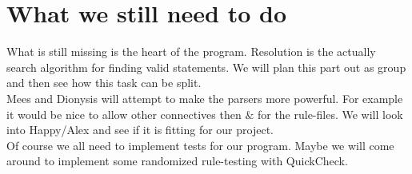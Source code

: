 \section{What we still need to do}
What is still missing is the heart of the program. Resolution is the actually search algorithm for finding valid statements. We will plan this part out as group and then see how this task can be split. \\
Mees and Dionysis will attempt to make the parsers more powerful. For example it would be nice to allow other connectives then $\&$ for the rule-files. We will look into Happy/Alex and see if it is fitting for our project.\\
Of course we all need to implement tests for our program. Maybe we will come around to implement some randomized rule-testing with QuickCheck. 